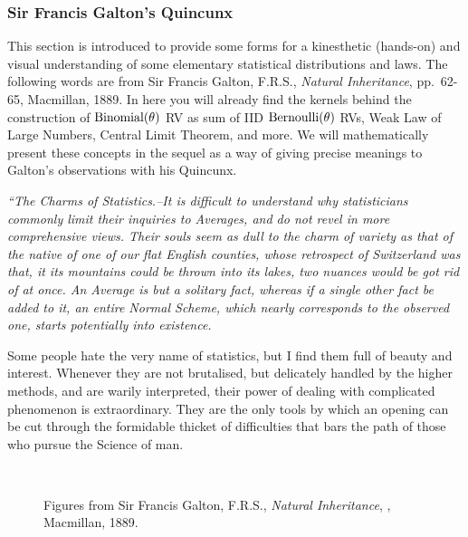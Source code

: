 \subsubsection{Sir Francis Galton's Quincunx}\label{S:Quincunx}
This section is introduced to provide some forms for a kinesthetic (hands-on) and visual understanding of some elementary statistical distributions and laws.  The following words are from Sir Francis Galton, F.R.S., {\em Natural Inheritance}, pp.~62-65, Macmillan, 1889.  In here you will already find the kernels behind the construction of $\mbox{{\rm Binomial}}(\theta)$ RV as sum of IID $\mbox{{\rm Bernoulli}}(\theta)$ RVs, Weak Law of Large Numbers, Central Limit Theorem, and more.  We will mathematically present these concepts in the sequel as a way of giving precise meanings to Galton's observations with his Quincunx.
{\it ``{\em The Charms of Statistics}.--It is difficult to understand why statisticians commonly limit their inquiries to Averages, and do not revel in more comprehensive views.  Their souls seem as dull to the charm of variety as that of the native of one of our flat English counties, whose retrospect of Switzerland was that, it its mountains could be thrown into its lakes, two nuances would be got rid of at once.  An Average is but a solitary fact, whereas if a single other fact be added to it, an entire Normal Scheme, which nearly corresponds to the observed one, starts potentially into existence.

Some people hate the very name of statistics, but I find them full of beauty and interest.  Whenever they are not brutalised, but delicately handled by the higher methods, and are warily interpreted, their power of dealing with complicated phenomenon is extraordinary.  They are the only tools by which an opening can be cut through the formidable thicket of difficulties that bars the path of those who pursue the Science of man.}

\begin{figure}[htpb]
\caption{Figures from Sir Francis Galton, F.R.S., {\em Natural Inheritance}, , Macmillan, 1889.\label{F:GaltonFigure78923}}
\mbox{ \hspace{-0.5cm}  }
\end{figure}

